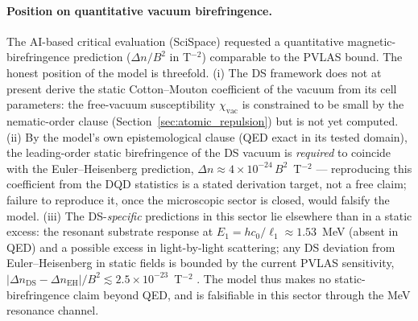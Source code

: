 \documentclass[11pt,a4paper]{article}
\theoremstyle{plain}
\theoremstyle{remark}
\begin{document}
\paragraph{Position on quantitative vacuum birefringence.} The AI-based critical evaluation (SciSpace) requested a quantitative magnetic-birefringence prediction ($\Delta n / B^2$ in T$^{-2}$) comparable to the PVLAS bound. The honest position of the model is threefold. (i) The DS framework does not at present derive the static Cotton--Mouton coefficient of the vacuum from its cell parameters: the free-vacuum susceptibility $\chi_{\text{vac}}$ is constrained to be small by the nematic-order clause (Section~\ref{sec:atomic_repulsion}) but is not yet computed. (ii) By the model's own epistemological clause (QED exact in its tested domain), the leading-order static birefringence of the DS vacuum is \emph{required} to coincide with the Euler--Heisenberg prediction, $\Delta n \approx 4\times10^{-24}\,B^2$~T$^{-2}$ --- reproducing this coefficient from the DQD statistics is a stated derivation target, not a free claim; failure to reproduce it, once the microscopic sector is closed, would falsify the model. (iii) The DS-\emph{specific} predictions in this sector lie elsewhere than in a static excess: the resonant substrate response at $E_1 = h c_0/\ell_1 \approx 1.53$~MeV (absent in QED) and a possible excess in light-by-light scattering; any DS deviation from Euler--Heisenberg in static fields is bounded by the current PVLAS sensitivity, $|\Delta n_{\text{DS}} - \Delta n_{\text{EH}}|/B^2 \lesssim 2.5\times10^{-23}$~T$^{-2}$ \cite{PVLAS2020}. The model thus makes no static-birefringence claim beyond QED, and is falsifiable in this sector through the MeV resonance channel.
\end{document}
